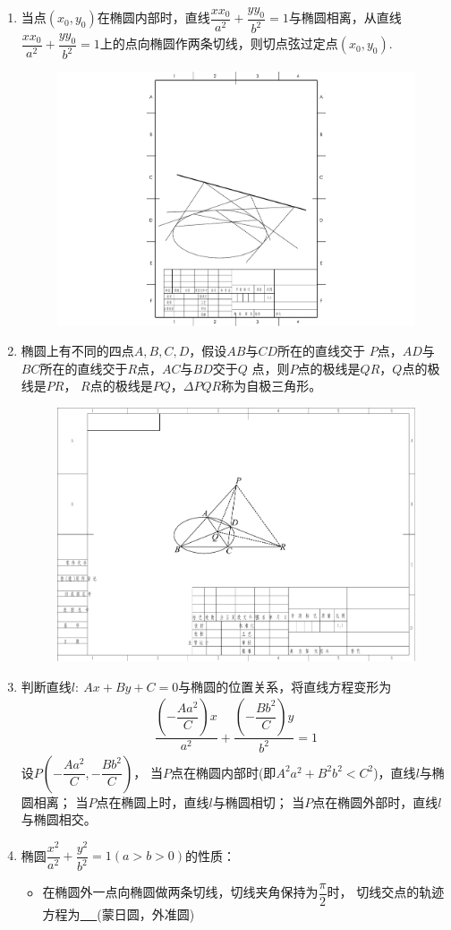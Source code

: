 \documentclass{article}
\newif\ifte
\begin{document}
\begin{multicols}{2}
\begin{enumerate}[leftmargin=20pt]
\item 当点$ (x_0,y_0) $在椭圆内部时，直线$ \dfrac{xx_0}{a^2}+
\dfrac{yy_0}{b^2}=1 $与椭圆相离，从直线$ \dfrac{xx_0}{a^2}+
\dfrac{yy_0}{b^2}=1 $上的点向椭圆作两条切线，则切点弦过定点$ (x_0,y_0) $.
\begin{figure}[H]
    \centering
    \includegraphics[width=0.5\linewidth]{配极原理-切点弦过定点}
\end{figure}

\item 椭圆上有不同的四点$ A,B,C,D $，假设$ AB $与$ CD $所在的直线交于
$ P $点，$ AD $与$ BC $所在的直线交于$ R $点，$ AC $与$ BD $交于$ Q $
点，则$ P $点的极线是$ QR $，$ Q $点的极线是$ PR $，
$ R $点的极线是$ PQ $，$ \Delta PQR $称为自极三角形。
\begin{figure}[H]
    \centering
    \includegraphics[width=0.6\linewidth]{自极三角形}
\end{figure}

\item 判断直线$ l:\ Ax+By+C=0 $与椭圆的位置关系，将直线方程变形为
\begin{gather*}
    \dfrac{\left(-\dfrac{Aa^2}{C}\right)x}{a^2}+
    \dfrac{\left(-\dfrac{Bb^2}{C}\right)y}{b^2}=1
\end{gather*}
设$ P\left(-\dfrac{Aa^2}{C},-\dfrac{Bb^2}{C}\right) $，
当$ P $点在椭圆内部时(即$ A^2a^2+B^2b^2<C^2 $)，直线$ l $与椭圆相离；
当$ P $点在椭圆上时，直线$ l $与椭圆相切；
当$ P $点在椭圆外部时，直线$ l $与椭圆相交。

\item 椭圆$ \dfrac{x^2}{a^2}+\dfrac{y^2}{b^2}=1 (a>b>0) $的性质：
\begin{itemize}[leftmargin=-4pt]
\item 在椭圆外一点向椭圆做两条切线，切线夹角保持为$ \dfrac{\pi}{2} $时，
切线交点的轨迹方程为\underline{\ \ifte $ x_0^2+y_0^2=a^2+b^2 $
    \else \hspace{3cm} \fi\ }(蒙日圆，外准圆)


\end{itemize}
\end{enumerate}
\end{multicols}
\end{document}
